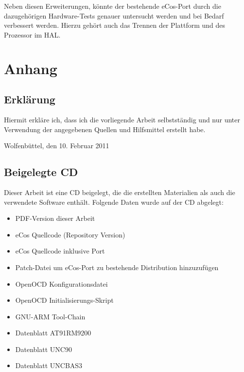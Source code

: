 \documentclass[
  a4paper,					%
  twoside,
  DIV=calc,     				%
  bibliography=totoc,
  cleardoublepage=empty,
  ngerman,     					%
  final       					%
]{scrbook}
\begin{document}
Neben diesen Erweiterungen, könnte der bestehende eCos-Port durch die dazugehörigen Hardware-Tests genauer untersucht werden und bei Bedarf verbessert werden. Hierzu gehört auch das Trennen der Plattform und des Prozessor im HAL.




\backmatter
\appendix
\part*{Anhang}






\chapter{Erklärung}
\label{sec:Erklärung}
Hiermit erkläre ich, dass ich die vorliegende Arbeit selbstständig und nur unter Verwendung der angegebenen Quellen und Hilfsmittel erstellt habe.
\vspace{2.5cm} \par
Wolfenbüttel, den 10. Februar 2011


\chapter{Beigelegte CD}
\label{sec:BeigelegteCD}
Dieser Arbeit ist eine CD beigelegt, die die erstellten Materialien als auch die verwendete Software enthält. Folgende Daten wurde auf der CD abgelegt:

\begin{itemize}
  \item PDF-Version dieser Arbeit
  \item eCos Quellcode (Repository Version)
  \item eCos Quellcode inklusive Port
  \item Patch-Datei um eCos-Port zu bestehende Distribution hinzuzufügen
  \item OpenOCD Konfigurationsdatei
  \item OpenOCD Initialisierungs-Skript
  \item GNU-ARM Tool-Chain
  \item Datenblatt AT91RM9200
  \item Datenblatt UNC90
  \item Datenblatt UNCBAS3
\end{itemize}
\end{document}
